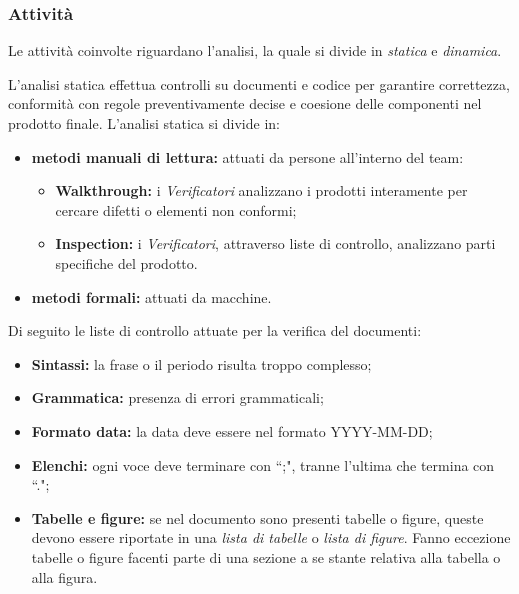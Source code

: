 \subsubsection{Attività}
Le attività coinvolte riguardano l'analisi, la quale si divide in \textit{statica} e \textit{dinamica}.

L'analisi statica effettua controlli su documenti e codice per garantire correttezza, conformità con regole preventivamente decise e coesione delle componenti nel prodotto finale.
L'analisi statica si divide in:
\begin{itemize}
	\item \textbf{metodi manuali di lettura:} attuati da persone all'interno del team:
	\begin{itemize}
		\item \textbf{Walkthrough:} i \textit{Verificatori} analizzano i prodotti interamente per cercare difetti o elementi non conformi;
		\item \textbf{Inspection:} i \textit{Verificatori}, attraverso liste di controllo, analizzano parti specifiche del prodotto.
	\end{itemize}
	\item \textbf{metodi formali:} attuati da macchine.
\end{itemize}

Di seguito le liste di controllo attuate per la verifica del documenti:
\begin{itemize}
	\item \textbf{Sintassi:} la frase o il periodo risulta troppo complesso;
	\item \textbf{Grammatica:} presenza di errori grammaticali;
	\item \textbf{Formato data:} la data deve essere nel formato YYYY-MM-DD;
	\item \textbf{Elenchi:} ogni voce deve terminare con ``;", tranne l'ultima che termina con ``.";
	\item \textbf{Tabelle e figure:} se nel documento sono presenti tabelle o figure, queste devono essere riportate in una \textit{lista di tabelle} o \textit{lista di figure}. Fanno eccezione tabelle o figure facenti parte di una sezione a se stante relativa alla tabella o alla figura.
\end{itemize}



